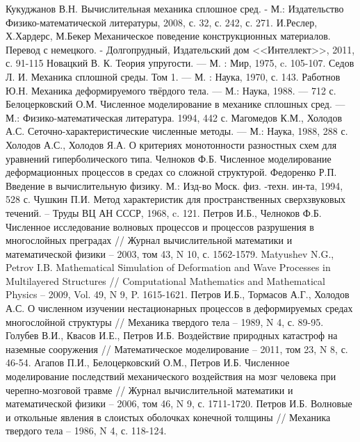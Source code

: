 \begin{thebibliography}{99}
Кукуджанов В.Н. Вычислительная механика сплошное сред. - М.: Издательство 
Физико-математической литературы, 2008, с. 32, с. 242, с. 271.
И.Реслер, Х.Хардерс, М.Бекер Механическое поведение конструкционных материалов. Перевод с немецкого. - Долгопрудный, Издательский дом <<Интеллект>>, 2011, с. 91-115
Новацкий В. К. Теория упругости. — М. : Мир, 1975, c. 105-107.
Седов Л. И. Механика сплошной среды. Том 1. — М. : Наука, 1970, с. 143.
Работнов Ю.Н. Механика деформируемого твёрдого тела. — М.: Наука, 1988. — 712 с.
Белоцерковский О.М. Численное моделирование в механике
сплошных сред. — М.: Физико-математическая литература. 1994, 442 с.
Магомедов К.М., Холодов А.С. Сеточно-характеристические
численные методы. — М.: Наука, 1988, 288 с.
Холодов А.С., Холодов Я.А. О критериях монотонности разностных
схем для уравнений гиперболического типа. 
Челноков Ф.Б. Численное моделирование деформационных
процессов в средах со сложной структурой.
Федоренко Р.П. Введение в вычислительную физику. М.:
Изд-во Моск. физ. -техн. ин-та, 1994, 528 с.
Чушкин П.И. Метод характеристик для пространственных сверхзвуковых течений. –  Труды ВЦ АН СССР, 1968, c. 121.
Петров И.Б., Челноков Ф.Б. Численное исследование волновых процессов и процессов разрушения в многослойных преградах // Журнал вычислительной математики и математической физики – 2003, том 43, N 10, с. 1562-1579.
Matyushev N.G., Petrov I.B. Mathematical Simulation of Deformation and Wave Processes in Multilayered Structures // Computational Mathematics and Mathematical Physics – 2009, Vol. 49, N 9, P. 1615-1621.
Петров  И.Б., Тормасов А.Г., Холодов А.С. О численном изучении нестационарных процессов в деформируемых средах многослойной структуры // Механика твердого тела – 1989, N 4, с. 89-95.
Голубев В.И., Квасов И.Е., Петров И.Б. Воздействие природных катастроф на наземные сооружения // Математическое моделирование – 2011, том 23, N 8, с. 46-54.
Агапов П.И., Белоцерковский О.М., Петров И.Б. Численное моделирование последствий механического воздействия на мозг человека при черепно-мозговой травме // Журнал вычислительной математики и математической физики – 2006, том 46, N 9, с. 1711-1720.
Петров И.Б. Волновые и откольные явления в слоистых оболочках конечной толщины // Механика твердого тела – 1986, N 4, с. 118-124.
\end{thebibliography}
